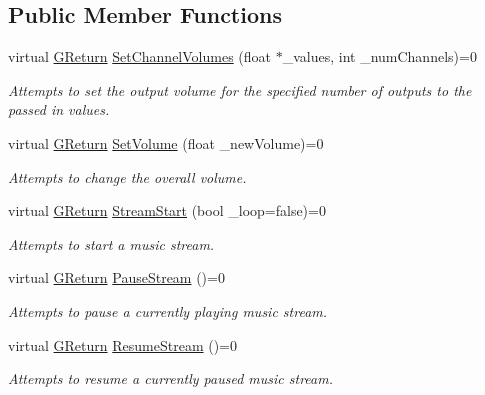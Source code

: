 \subsection*{Public Member Functions}
\begin{DoxyCompactItemize}
\item 
virtual \mbox{\hyperlink{namespace_g_w_a67a839e3df7ea8a5c5686613a7a3de21}{G\+Return}} \mbox{\hyperlink{class_g_w_1_1_a_u_d_i_o_1_1_g_music_a84e2bcb837e97f5653ab6c356122d705}{Set\+Channel\+Volumes}} (float $\ast$\+\_\+values, int \+\_\+num\+Channels)=0
\begin{DoxyCompactList}\small\item\em Attempts to set the output volume for the specified number of outputs to the passed in values. \end{DoxyCompactList}\item 
virtual \mbox{\hyperlink{namespace_g_w_a67a839e3df7ea8a5c5686613a7a3de21}{G\+Return}} \mbox{\hyperlink{class_g_w_1_1_a_u_d_i_o_1_1_g_music_a3a98aa8e77a9db8e9d1c735c4740391d}{Set\+Volume}} (float \+\_\+new\+Volume)=0
\begin{DoxyCompactList}\small\item\em Attempts to change the overall volume. \end{DoxyCompactList}\item 
virtual \mbox{\hyperlink{namespace_g_w_a67a839e3df7ea8a5c5686613a7a3de21}{G\+Return}} \mbox{\hyperlink{class_g_w_1_1_a_u_d_i_o_1_1_g_music_a3eec6db115638a770bf6ebfc7bc32f19}{Stream\+Start}} (bool \+\_\+loop=false)=0
\begin{DoxyCompactList}\small\item\em Attempts to start a music stream. \end{DoxyCompactList}\item 
virtual \mbox{\hyperlink{namespace_g_w_a67a839e3df7ea8a5c5686613a7a3de21}{G\+Return}} \mbox{\hyperlink{class_g_w_1_1_a_u_d_i_o_1_1_g_music_a6a7a4efcf2d54bcf53429cedd7687e73}{Pause\+Stream}} ()=0
\begin{DoxyCompactList}\small\item\em Attempts to pause a currently playing music stream. \end{DoxyCompactList}\item 
virtual \mbox{\hyperlink{namespace_g_w_a67a839e3df7ea8a5c5686613a7a3de21}{G\+Return}} \mbox{\hyperlink{class_g_w_1_1_a_u_d_i_o_1_1_g_music_a56cc4db5fab860fdb948630b821bcdbd}{Resume\+Stream}} ()=0
\begin{DoxyCompactList}\small\item\em Attempts to resume a currently paused music stream. \end{DoxyCompactList}\item 

\end{DoxyCompactItemize}
